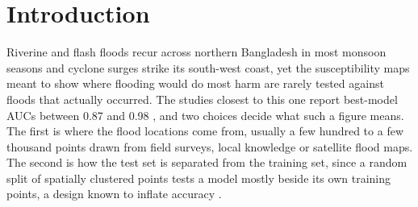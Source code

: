 \documentclass[10pt,a4paper,twocolumn]{article}
\begin{document}

\thispagestyle{plain}

\section{Introduction}
\label{sec:intro}

Riverine and flash floods recur across northern Bangladesh in most monsoon seasons and cyclone surges strike its south-west coast, yet the susceptibility maps meant to show where flooding would do most harm are rarely tested against floods that actually occurred. The studies closest to this one report best-model AUCs between 0.87 and 0.98 \citep{islam2021, talukdar2020, islamr2024, adnan2023}, and two choices decide what such a figure means. The first is where the flood locations come from, usually a few hundred to a few thousand points drawn from field surveys, local knowledge or satellite flood maps. The second is how the test set is separated from the training set, since a random split of spatially clustered points tests a model mostly beside its own training points, a design known to inflate accuracy \citep{roberts2017, ploton2020}.
\end{document}
